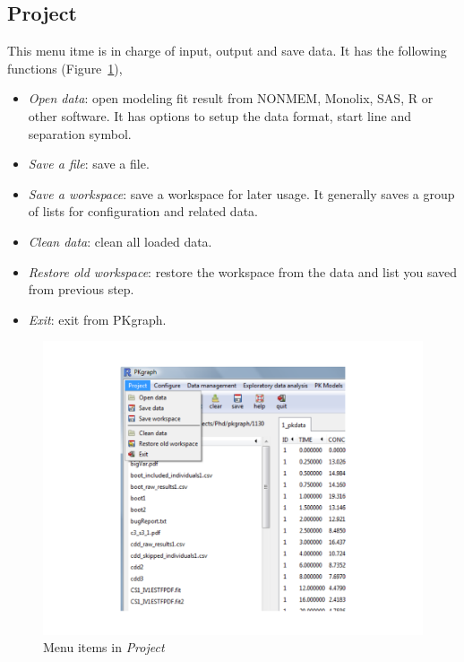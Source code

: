 \documentclass[a4paper]{article}
\begin{document}
\subsection{Project}
This menu itme is in charge of input, output and save data. It has the following functions (Figure~\ref{project}),
\begin{itemize}
	\item \textit{Open data}: open modeling fit result from NONMEM, Monolix, SAS, R or other software.
  It has options to setup the data format, start line and separation symbol.
	\item \textit{Save a file}: save a file.
	\item \textit{Save a workspace}: save a workspace for later usage. It generally saves a group of lists
	for configuration and related data.
	\item \textit{Clean data}: clean all loaded data.		
	\item \textit{Restore old workspace}: restore the workspace from the data and list you saved from previous step.
	\item \textit{Exit}: exit from PKgraph.
\end{itemize}
\begin{figure}[h!tb] \centering
\includegraphics[scale=0.6]{project.pdf}
\caption{Menu items in \textit{Project}}
\label{project}
\end{figure}
\end{document}
